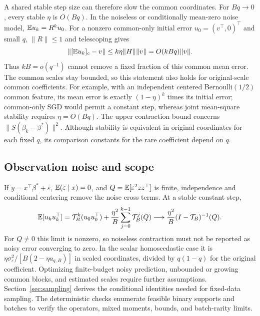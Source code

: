 A shared stable step size can therefore slow the common coordinates. For
$Bq \to 0$, every stable $\eta$ is $O(Bq)$. In the noiseless or conditionally
mean-zero noise model, $\mathbb{E} u_k = R^ku_0$. For a nonzero common-only initial
error $u_0 = (v^\top,0)^\top$ and small $q$, $\|R\| \le 1$ and telescoping gives
\[
 \|[\mathbb{E} u_k]_c - v\| \le k\eta\|H\|\|v\| = O(kBq)\|v\|.
\]
Thus $kB = o(q^{-1})$ cannot remove a fixed fraction of this common mean error.
The common scales stay bounded, so this statement also holds for original-scale
common coefficients. For example, with an independent centered Bernoulli$(1/2)$
common feature, its mean error is exactly $(1 - \eta)^k$ times its initial
error; common-only SGD would permit a constant step, whereas joint mean-square
stability requires $\eta = O(Bq)$. The upper contraction bound concerns
$\|S(\beta_k - \beta^*)\|^2$. Although stability is equivalent in original
coordinates for each fixed $q$, its comparison constants for the rare
coefficient depend on $q$.

\subsection{Observation noise and scope}

If $y = x^\top\beta^* + \varepsilon$, $\mathbb{E}(\varepsilon \mid x) = 0$, and
$Q = \mathbb{E}[\varepsilon^2zz^\top]$ is finite, independence and conditional centering
remove the noise cross terms. At a stable constant step,
\[
 \mathbb{E}[u_ku_k^\top] = \mathcal T_B^k(u_0u_0^\top)
                   + \frac{\eta^2}{B}\sum_{j=0}^{k-1}\mathcal T_B^j(Q)
                 \longrightarrow \frac{\eta^2}{B}(I - \mathcal T_B)^{-1}(Q).
\]
For $Q \ne 0$ this limit is nonzero, so noiseless contraction must not be
reported as noisy error converging to zero. In the scalar homoscedastic case it
is $\eta\sigma_\varepsilon^2/[B(2 - \eta a_{q,B})]$ in scaled coordinates,
divided by $q(1 - q)$ for the original coefficient. Optimizing finite-budget
noisy prediction, unbounded or growing common blocks, and estimated scales
require further assumptions. Section~\ref{sec:sampling} derives the conditional
identities needed for fixed-data sampling. The deterministic checks enumerate
feasible binary supports and batches to verify the operators, mixed moments,
bounds, and batch-rarity limits.
